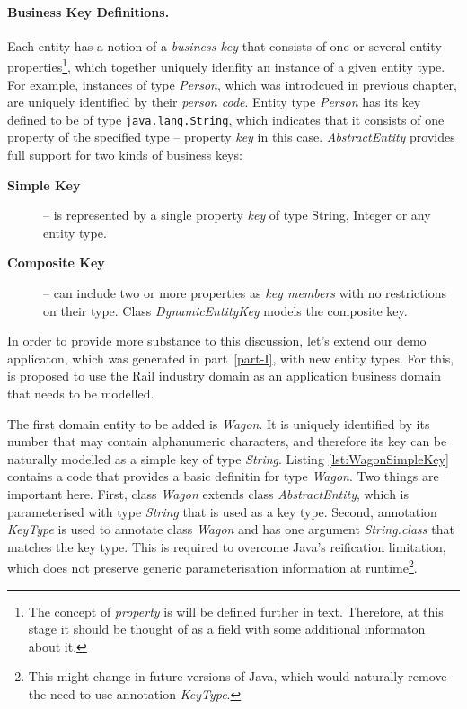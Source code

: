   \paragraph*{Business Key Definitions.}
  Each entity has a notion of a \emph{business key} that consists of one or several entity properties\footnote{The concept of \emph{property} is will be defined further in text. Therefore, at this stage it should be thought of as a field with some additional informaton about it.}, which together uniquely idenfity an instance of a given entity type.
  For example, instances of type \emph{Person}, which was introdcued in previous chapter, are uniquely identified by their \emph{person code}.
  Entity type \emph{Person} has its key defined to be of type \texttt{java.lang.String}, which indicates that it consists of one property of the specified type -- property \emph{key} in this case.
  \emph{AbstractEntity} provides full support for two kinds of business keys:
  \begin{description}
    \item[\textbf{Simple Key}] -- is represented by a single property \emph{key} of type String, Integer or any entity type.
    \item[\textbf{Composite Key}] -- can include two or more properties as \emph{key members} with no restrictions on their type. Class \emph{DynamicEntityKey} models the composite key.
   \end{description}

  In order to provide more substance to this discussion, let's extend our demo applicaton, which was generated in part~\ref{part-I}, with new entity types.
  For this, is proposed to use the Rail industry domain as an application business domain that needs to be modelled.
  
  The first domain entity to be added is \emph{Wagon}.
  It is uniquely identified by its number that may contain alphanumeric characters, and therefore its key can be naturally modelled as a simple key of type \emph{String}.
  Listing \ref{lst:WagonSimpleKey} contains a code that provides a basic definitin for type \emph{Wagon}.
  Two things are important here.
  First, class \emph{Wagon} extends class \emph{AbstractEntity}, which is parameterised with type \emph{String} that is used as a key type.
  Second, annotation \emph{KeyType} is used to annotate class \emph{Wagon} and has one argument \emph{String.class} that matches the key type.
  This is required to overcome Java's reification limitation, which does not preserve generic parameterisation information at runtime\footnote{This might change in future versions of Java, which would naturally remove the need to use annotation \emph{KeyType}.}.

